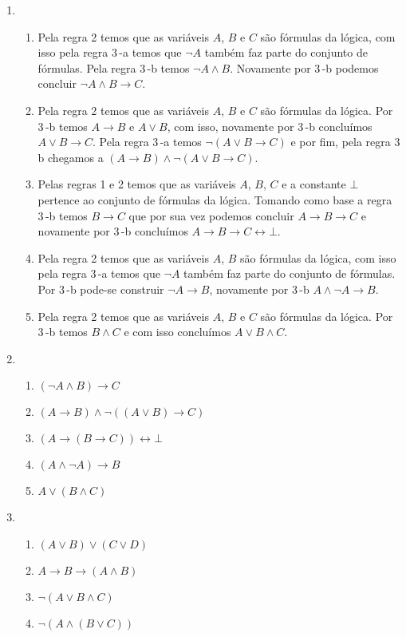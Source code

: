 	\begin{enumerate}
	
			\item 
			\begin{enumerate}		
					\item 
					Pela regra 2 temos que as vari\'aveis $A$, $B$ e $C$ s\~ao f\'ormulas da l\'ogica, com isso pela regra 3\,-a temos que $\neg A$ tamb\'em faz parte do conjunto de f\'ormulas. Pela regra 3\,-b temos $\neg A \land B$. Novamente por 3\,-b podemos concluir $\neg A \land B \to C $. 
					
					\item
					Pela regra 2 temos que as vari\'aveis $A$, $B$ e $C$ s\~ao f\'ormulas da l\'ogica. Por 3\,-b temos $A \to B$ e $A \lor B$, com isso, novamente por 3\,-b conclu\'imos $A \lor B \to C$. Pela regra 3\,-a temos $\neg(A \lor B \to C)$ e por fim, pela regra 3\,b chegamos a $(A \to B) \land \neg(A \lor B \to C)$.
					
					\item
					Pelas regras 1 e 2 temos que as vari\'aveis $A$, $B$, $C$ e a constante $ \bot $ pertence ao conjunto de f\'ormulas da l\'ogica. Tomando como base a regra 3\,-b temos $B \to C$ que por sua vez podemos concluir $A \to B \to C $ e novamente por 3\,-b conclu\'imos  $A \to B \to C \leftrightarrow \bot $.
					
					\item
					Pela regra 2 temos que as vari\'aveis $A$, $B$ s\~ao f\'ormulas da l\'ogica, com isso pela regra 3\,-a temos que $\neg A$ tamb\'em faz parte do conjunto de f\'ormulas. Por 3\,-b pode-se construir $\neg A \to B $, novamente por 3\,-b $ A \land \neg A \to B $.
					
					\item
					Pela regra 2 temos que as vari\'aveis $A$, $B$ e $C$ s\~ao f\'ormulas da l\'ogica. Por 3\,-b temos $B \land C$ e com isso conclu\'imos $A \lor B \land C$.			
			\end{enumerate}
			
			\item
			\begin{enumerate}
				\item $(\neg A \land B) \to C$
				\item $(A \to B) \land \neg((A \lor B) \to C)$
				\item $(A \to (B \to C)) \leftrightarrow \bot$
				\item $(A \land \neg A) \to B$
				\item $A \lor (B \land C)$
			\end{enumerate}
			
			
			\item
			\begin{enumerate}
				\item $(A \lor B) \lor (C \lor D)$
				\item $A \to B \to (A \land B)$
				\item $\neg (A \lor B \land C)$
				\item $\neg (A \land (B \lor C))$
			\end{enumerate}
	
	\end{enumerate}

